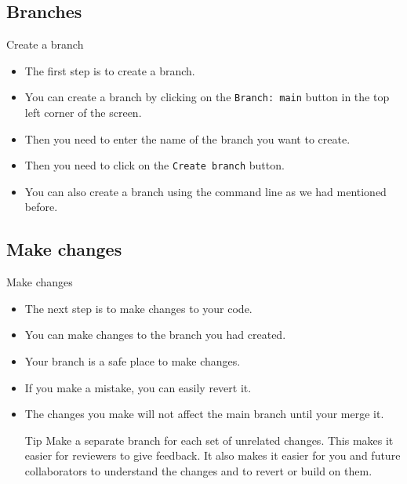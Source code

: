 \documentclass{beamer}
\begin{document}
\subsection{Branches}

\begin{frame}{Create a branch}
    \begin{itemize}
        \item The first step is to create a branch.
        \item You can create a branch by clicking on the \texttt{Branch: main} button in the top left corner of the screen.
        \item Then you need to enter the name of the branch you want to create.
        \item Then you need to click on the \texttt{Create branch} button.
        \item You can also create a branch using the command line as we had mentioned before.
    \end{itemize}
\end{frame}

\subsection{Make changes}

\begin{frame}{Make changes}
    \begin{itemize}
        \item The next step is to make changes to your code.
        \item You can make changes to the branch you had created.
        \item Your branch is a safe place to make changes.
        \item If you make a mistake, you can easily revert it.
        \item The changes you make will not affect the main branch until your merge it.

        \begin{block}{Tip}
            Make a separate branch for each set of unrelated changes. This makes it easier for reviewers to give feedback. It also makes it easier for you and future collaborators to understand the changes and to revert or build on them.
        \end{block}

    \end{itemize}
\end{frame}
\end{document}
